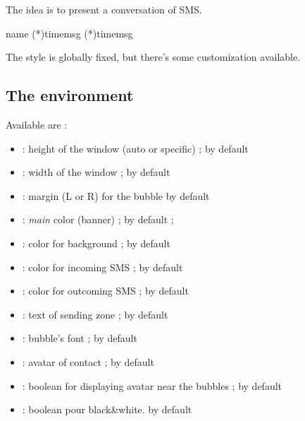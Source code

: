 \documentclass[english,11pt,a4paper]{article}
\begin{document}
The idea is to present a conversation of SMS.

\begin{codehigh}[language=latex/latex3,style/main=teal!25,style/code=teal!25]
\begin{ChatSMS}[keys]{name}
  \InSMS(*){time}{msg}
  \OutSMS*(*){time}{msg}
\end{ChatSMS}
\end{codehigh}

The style is globally fixed, but there's some customization available.

\subsection{The environment}

Available  are :

\begin{itemize}
	\item {} : height of the window (auto or specific) ;  by default
	\item {} : width of the window ; \MontreCode{7cm} by default
	\item {} : margin (L or R) for the bubble \MontreCode{1.5cm} by default
	\item {} : \textit{main} color (banner) ;  by default ;
	\item {} : color for background ;  by default
	\item {} : color for incoming SMS ;  by default
	\item {} : color for outcoming SMS ;  by default
	\item {} : text of sending zone ;  by default
	\item {} : bubble's font ;  by default
	\item {} : avatar of contact ;  by default
	\item {} : boolean for displaying avatar near the bubbles ;  by default
	\item {} : boolean pour black\&white.  by default
\end{itemize}
\end{document}
